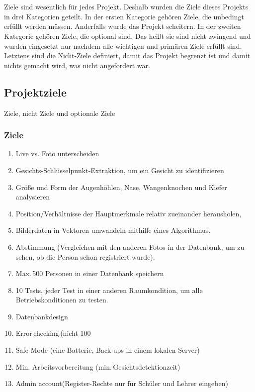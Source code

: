 \chapter{\docname}
\label{\docname}
Ziele sind wesentlich für jedes Projekt. Deshalb wurden die Ziele dieses Projekts in drei Kategorien geteilt.
In der ersten Kategorie gehören Ziele, die unbedingt erfüllt werden müssen. Anderfalls wurde das Projekt scheitern.
In der zweiten Kategorie gehören Ziele, die optional sind. Das heißt sie sind nicht zwingend und wurden eingesetzt nur nachdem alle wichtigen und primären Ziele erfüllt sind.
Letztens sind die Nicht-Ziele definiert, damit das Projekt begrenzt ist und damit nichts gemacht wird, was nicht angefordert war.
\section{Projektziele}
Ziele, nicht Ziele und optionale Ziele
\subsection{Ziele}
\begin{enumerate}
\item Live vs. Foto unterscheiden     

\item Gesichts-Schlüsselpunkt-Extraktion, um ein Gesicht zu identifizieren  

\item Größe und Form der Augenhöhlen, Nase, Wangenknochen und Kiefer analysieren 

\item Position/Verhältnisse der Hauptmerkmale relativ zueinander herausholen, 

\item Bilderdaten in Vektoren umwandeln mithilfe eines Algorithmus. 

\item Abstimmung (Vergleichen mit den anderen Fotos in der Datenbank, um zu sehen, ob die Person schon registriert wurde). 

\item Max. 500 Personen in einer Datenbank speichern 

\item 10 Tests, jeder Test in einer anderen Raumkondition, um    alle Betriebskonditionen zu testen. 

\item Datenbankdesign 

\item Error checking (nicht 100%

\item Safe Mode (eine Batterie, Back-ups in einem lokalen         Server) 

\item Min. Arbeitsvorbereitung (min. Gesichtsdetektionzeit) 

\item Admin account(Register-Rechte nur für Schüler und Lehrer eingeben) 

\end{enumerate}
